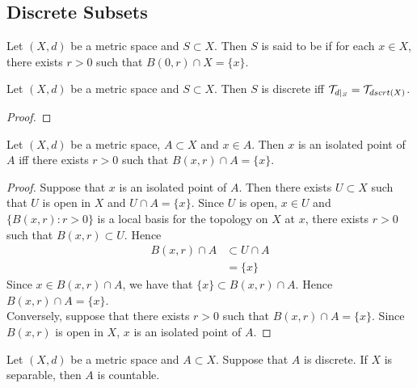 \documentclass{book}
\begin{document}
\subsection{Discrete Subsets}

\begin{defn}
	Let $(X,d)$ be a metric space and $S \subset X$. Then $S$ is said to be  if for each $x \in X$, there exists $r > 0$ such that $B(0, r) \cap X = \{x\}$. 
\end{defn}

\begin{ex}
	Let $(X, d)$ be a metric space and $S \subset X$. Then $S$ is discrete iff $\mathcal{T}_{d|_S} = \mathcal{T}_{dscrt(X)}$.   
\end{ex}

\begin{proof}
\end{proof}

\begin{ex} 
	Let $(X, d)$ be a metric space, $A \subset X$ and $x \in A$. Then $x$ is an isolated point of $A$ iff there exists $r > 0$ such that $B(x, r) \cap A = \{x\}$. 
\end{ex}

\begin{proof}
	Suppose that $x$ is an isolated point of $A$. Then there exists $U \subset X$ such that $U$ is open in $X$ and $U \cap A = \{x\}$. Since $U$ is open, $x \in U$ and $\{B(x, r): r > 0\}$ is a local basis for the topology on $X$ at $x$, there exists $r > 0$ such that $B(x, r) \subset U$. Hence 
	\begin{align*}
		B(x, r) \cap A 
		& \subset U \cap A \\
		& = \{x\}
	\end{align*}
	Since $x \in B(x, r) \cap A$, we have that $\{x\} \subset B(x, r) \cap A$. Hence $B(x, r) \cap A = \{x\}$. \\
	Conversely, suppose that there exists $r > 0$ such that $B(x, r) \cap A = \{x\}$. Since $B(x, r)$ is open in $X$, $x$ is an isolated point of $A$. 
\end{proof}

\begin{ex}
	Let $(X, d)$ be a metric space and $A \subset X$. Suppose that $A$ is discrete. If $X$ is separable, then $A$ is countable. \\
\end{ex}
\end{document}
